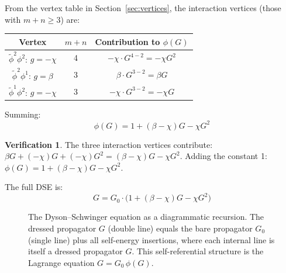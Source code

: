 \documentclass[11pt,a4paper]{article}
\theoremstyle{definition}
\newtheorem*{verification}{Verification}
\newcommand{\phit}{\tilde{\phi}}
\begin{document}
From the vertex table in Section~\ref{sec:vertices}, the interaction
vertices (those with $m{+}n \geq 3$) are:

\begin{center}
\begin{tabular}{ccc}
\toprule
Vertex & $m+n$ & Contribution to $\phi(G)$ \\
\midrule
$\phit^2\phi^2$: $g = -\chi$ & 4 & $-\chi \cdot G^{4-2} = -\chi G^2$ \\
$\phit^2\phi^1$: $g = \beta$ & 3 & $\beta \cdot G^{3-2} = \beta G$ \\
$\phit^1\phi^2$: $g = -\chi$ & 3 & $-\chi \cdot G^{3-2} = -\chi G$ \\
\bottomrule
\end{tabular}
\end{center}

Summing:
\begin{equation}
\boxed{\phi(G) = 1 + (\beta - \chi) G - \chi G^2}
\label{eq:gribov_phi}
\end{equation}

\begin{verification}
The three interaction vertices contribute:
$\beta G + (-\chi)G + (-\chi)G^2 = (\beta - \chi)G - \chi G^2$.
Adding the constant 1: $\phi(G) = 1 + (\beta{-}\chi)G - \chi G^2$. \checkmark
\end{verification}

The full DSE is:
\begin{equation}
G = G_0 \cdot \bigl(1 + (\beta - \chi) G - \chi G^2\bigr)
\label{eq:gribov_dse_full}
\end{equation}

\begin{figure}[H]
\centering
{}
\caption{The Dyson--Schwinger equation as a diagrammatic recursion.
The dressed propagator $G$ (double line) equals the bare propagator $G_0$
(single line) plus all self-energy insertions, where each internal line
is itself a dressed propagator $G$. This self-referential structure is
the Lagrange equation $G = G_0\,\phi(G)$.}
\label{fig:dse_diagrammatic}
\end{figure}
\end{document}
